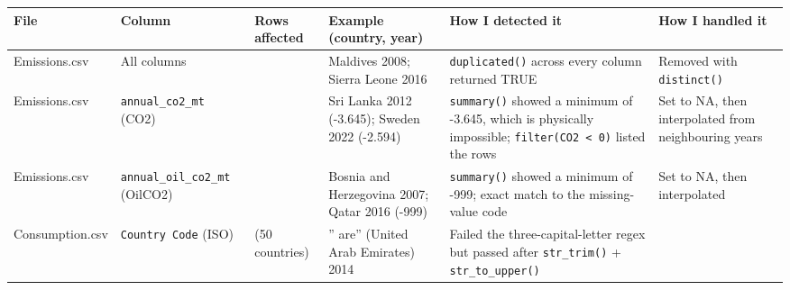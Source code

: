 \documentclass[
]{article}
\newcounter{none} %
\begin{document}
{\def\LTcaptype{none} %
\begin{longtable}[]{@{}
  >{\raggedright\arraybackslash}p{}
  >{\raggedright\arraybackslash}p{}
  >{\raggedright\arraybackslash}p{}
  >{\raggedright\arraybackslash}p{}
  >{\raggedright\arraybackslash}p{}
  >{\raggedright\arraybackslash}p{}@{}}
\toprule\noalign{}
\begin{minipage}[b]{\linewidth}\raggedright
File
\end{minipage} & \begin{minipage}[b]{\linewidth}\raggedright
Column
\end{minipage} & \begin{minipage}[b]{\linewidth}\raggedright
Rows affected
\end{minipage} & \begin{minipage}[b]{\linewidth}\raggedright
Example (country, year)
\end{minipage} & \begin{minipage}[b]{\linewidth}\raggedright
How I detected it
\end{minipage} & \begin{minipage}[b]{\linewidth}\raggedright
How I handled it
\end{minipage} \\
\midrule\noalign{}
\endhead
\bottomrule\noalign{}
\endlastfoot
Emissions.csv & All columns & 5 & Maldives 2008; Sierra Leone 2016 &
\texttt{duplicated()} across every column returned TRUE & Removed with
\texttt{distinct()} \\
Emissions.csv & \texttt{annual\_co2\_mt} (CO2) & 4 & Sri Lanka 2012
(-3.645); Sweden 2022 (-2.594) & \texttt{summary()} showed a minimum of
-3.645, which is physically impossible;
\texttt{filter(CO2\ \textless{}\ 0)} listed the rows & Set to NA, then
interpolated from neighbouring years \\
Emissions.csv & \texttt{annual\_oil\_co2\_mt} (OilCO2) & 5 & Bosnia and
Herzegovina 2007; Qatar 2016 (-999) & \texttt{summary()} showed a
minimum of -999; exact match to the missing-value code & Set to NA, then
interpolated \\
Consumption.csv & \texttt{Country\ Code} (ISO) & 76 (50 countries) & ''
are'' (United Arab Emirates) 2014 & Failed the three-capital-letter
regex but passed after \texttt{str\_trim()} + \texttt{str\_to\_upper()}

\end{longtable}}
\end{document}
